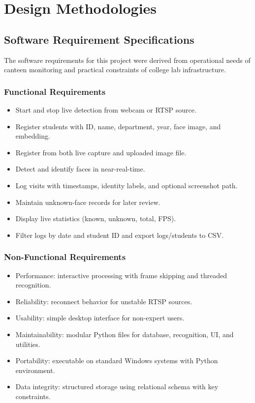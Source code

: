 \documentclass{fisatprojectfinal}
\begin{document}
\chapter{Design Methodologies}

\section{Software Requirement Specifications}
The software requirements for this project were derived from operational needs of canteen monitoring and practical constraints of college lab infrastructure.

\subsection{Functional Requirements}
\begin{itemize}
	\item Start and stop live detection from webcam or RTSP source.
	\item Register students with ID, name, department, year, face image, and embedding.
	\item Register from both live capture and uploaded image file.
	\item Detect and identify faces in near-real-time.
	\item Log visits with timestamps, identity labels, and optional screenshot path.
	\item Maintain unknown-face records for later review.
	\item Display live statistics (known, unknown, total, FPS).
	\item Filter logs by date and student ID and export logs/students to CSV.
\end{itemize}

\subsection{Non-Functional Requirements}
\begin{itemize}
	\item Performance: interactive processing with frame skipping and threaded recognition.
	\item Reliability: reconnect behavior for unstable RTSP sources.
	\item Usability: simple desktop interface for non-expert users.
	\item Maintainability: modular Python files for database, recognition, UI, and utilities.
	\item Portability: executable on standard Windows systems with Python environment.
	\item Data integrity: structured storage using relational schema with key constraints.
\end{itemize}
\end{document}
